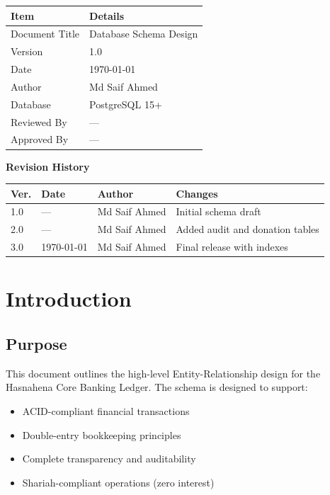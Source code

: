 \documentclass[11pt,a4paper]{article}
\newcommand{\DocumentTitle}{Database Schema Design}
\newcommand{\DocumentVersion}{1.0}
\newcommand{\DocumentDate}{\today}
\begin{document}
\begin{tabular}{@{}p{3cm}p{10cm}@{}}
\toprule
\textbf{Item} & \textbf{Details} \\
\midrule
Document Title & \DocumentTitle \\
Version & \DocumentVersion \\
Date & \DocumentDate \\
Author & Md Saif Ahmed \\
Database & PostgreSQL 15+ \\
Reviewed By & --- \\
Approved By & --- \\
\bottomrule
\end{tabular}

\vspace{1em}

\textbf{Revision History}

\begin{tabular}{@{}p{1.2cm}p{2.5cm}p{3.5cm}p{5.5cm}@{}}
\toprule
\textbf{Ver.} & \textbf{Date} & \textbf{Author} & \textbf{Changes} \\
\midrule
1.0 & --- & Md Saif Ahmed & Initial schema draft \\
2.0 & --- & Md Saif Ahmed & Added audit and donation tables \\
3.0 & \DocumentDate & Md Saif Ahmed & Final release with indexes \\
\bottomrule
\end{tabular}

\newpage

\section{Introduction}

\subsection{Purpose}
This document outlines the high-level Entity-Relationship design for the Hasnahena Core Banking Ledger. The schema is designed to support:
\begin{itemize}
    \item ACID-compliant financial transactions
    \item Double-entry bookkeeping principles
    \item Complete transparency and auditability
    \item Shariah-compliant operations (zero interest)
\end{itemize}
\end{document}
